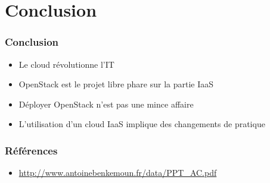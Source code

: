   \section*{Conclusion}
  \begin{frame}
    \frametitle{Conclusion}
    \begin{itemize}
      \item Le cloud révolutionne l'IT
      \item OpenStack est le projet libre phare sur la partie IaaS
      \item Déployer OpenStack n'est pas une mince affaire
      \item L'utilisation d'un cloud IaaS implique des changements de pratique
    \end{itemize}
  \end{frame}

  \begin{frame}
    \frametitle{Références}
    \begin{itemize}
      \item \url{http://www.antoinebenkemoun.fr/data/PPT_AC.pdf}
    \end{itemize}
  \end{frame}
